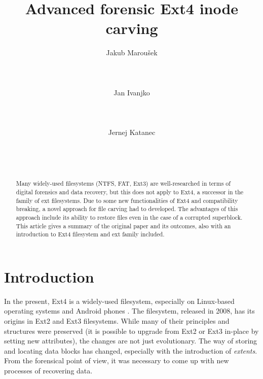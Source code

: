 \documentclass{acm_proc_article-sp}
\begin{document}
\title{Advanced forensic Ext4 inode carving}

\author{
\alignauthor Jakub Marou\v sek \\
	\\
    \\
    \\
\alignauthor Jan Ivanjko \\
	\\
    \\
    \\
\alignauthor Jernej Katanec \\
	\\
    \\
    \\
}

\maketitle
\begin{abstract}
Many widely-used filesystems (NTFS, FAT, Ext3) are well-researched in terms of digital forensics and data recovery, but this does not apply to Ext4, a successor in the family of ext filesystems. Due to some new functionalities of Ext4 and compatibility breaking, a novel approach for file carving had to developed. The advantages of this approach include its ability to restore files even in the case of a corrupted superblock. This article gives a summary of the original paper and its outcomes, also with an introduction to Ext4 filesystem and ext family included.
\end{abstract}

\section{Introduction}

In the present, Ext4 is a widely-used filesystem, especially on Linux-based operating systems and Android phones \cite{afeic}. The filesystem, released in 2008, has its origins in Ext2 and Ext3 filesystems. While many of their principles and structures were preserved (it is possible to upgrade from Ext2 or Ext3 in-place by setting new attributes), the changes are not just evolutionary. The way of storing and locating data blocks has changed, especially with the introduction of {\it extents}. From the forensical point of view, it was necessary to come up with new processes of recovering data.
\end{document}
